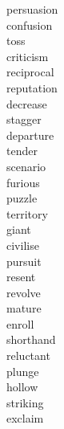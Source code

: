 \documentclass[a4paper, 10pt]{ctexart}
\begin{document}
\begin{multicols*}{2}
\begin{description}
\item[persuasion]

\item[confusion]

\item[toss]

\item[criticism]

\item[reciprocal]

\item[reputation]

\item[decrease]

\item[stagger]

\item[departure]

\item[tender]

\item[scenario]

\item[furious]

\item[puzzle]

\item[territory]

\item[giant]

\item[civilise]

\item[pursuit]

\item[resent]

\item[revolve]

\item[mature]

\item[enroll]

\item[shorthand]

\item[reluctant]

\item[plunge]

\item[hollow]

\item[striking]

\item[exclaim]


\end{description}
\end{multicols*}
\end{document}
